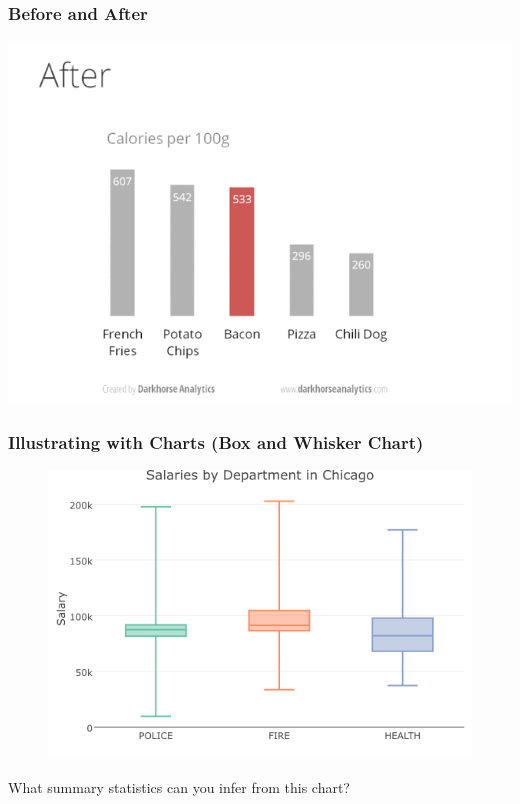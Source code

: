 \documentclass{beamer}
\begin{document}
\begin{frame}
\frametitle{Before and After}
	\includegraphics[width = \textwidth, height = 0.8\textheight]{./images/designAfter.png}
\end{frame}

\begin{frame}
\frametitle{Illustrating with Charts (Box and Whisker Chart)}
	\begin{figure}
		\includegraphics[scale = 0.45]{./images/chicagoBoxPlot.png}
	\end{figure}
	What summary statistics can you infer from this chart?
\end{frame}
\end{document}
